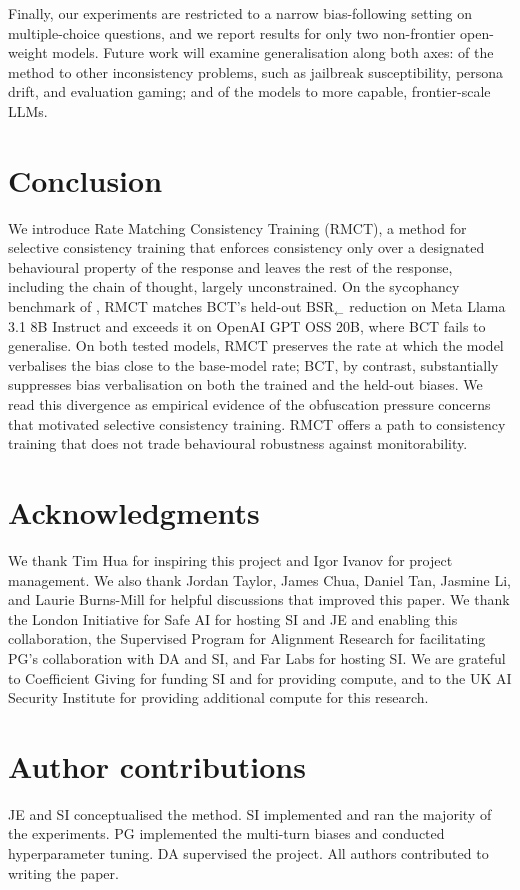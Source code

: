 \documentclass{article}
\begin{document}
Finally, our experiments are restricted to a narrow bias-following setting on
multiple-choice questions, and we report results for only two
non-frontier open-weight models. Future work will examine
generalisation along both axes: of the method to other inconsistency
problems, such as jailbreak susceptibility, persona drift, and
evaluation gaming; and of the models to more capable,
frontier-scale LLMs. 

\section{Conclusion}
We introduce Rate Matching Consistency Training (RMCT), a
method for selective consistency training that enforces consistency
only over a designated behavioural property of the response and
leaves the rest of the response, including the chain of thought,
largely unconstrained. On the sycophancy benchmark of
\citet{chua_bias-augmented_2024}, RMCT matches BCT's held-out
$\text{BSR}_{\leftarrow}$ reduction on Meta Llama 3.1 8B Instruct
and exceeds it on OpenAI GPT OSS 20B, where BCT fails to generalise.
On both tested models, RMCT preserves the rate at which the model verbalises the bias close to the base-model rate;
BCT, by contrast, substantially suppresses bias verbalisation on both
the trained and the held-out biases. We read this divergence as empirical evidence of the obfuscation pressure concerns that motivated
selective consistency training. RMCT offers a path to consistency training that does not trade
behavioural robustness against monitorability.

\section*{Acknowledgments}
We thank Tim Hua for inspiring this project and Igor Ivanov for
project management. We also thank Jordan Taylor, James Chua, Daniel Tan, Jasmine Li, and Laurie Burns-Mill for helpful discussions that improved this paper. We
thank the London Initiative for Safe AI for hosting SI and JE and
enabling this collaboration, the Supervised Program for Alignment
Research for facilitating PG's collaboration with DA and SI, and Far Labs for hosting SI. We are
grateful to Coefficient Giving for funding SI and for providing
compute, and to the UK AI Security Institute for providing additional
compute for this research.

\section*{Author contributions}
JE and SI conceptualised the method. SI implemented and ran the
majority of the experiments. PG implemented the multi-turn biases and
conducted hyperparameter tuning. DA supervised the project. All
authors contributed to writing the paper.
\end{document}
